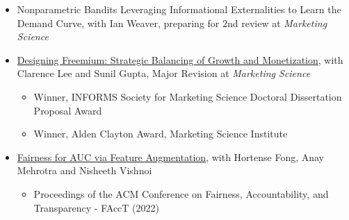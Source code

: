 \documentclass[margin, line, centered, 10pt]{res}
\begin{document}
\begin{resume}
\begin{itemize}
\item Nonparametric Bandits Leveraging Informational Externalities to Learn the Demand Curve, with Ian Weaver, preparing for 2nd review at \textit{Marketing Science}
\item  \href{http://vineetkumars.github.io/Papers/DesigningFreemiumS2019.pdf}{Designing Freemium: Strategic Balancing of Growth and Monetization}, with Clarence Lee and Sunil Gupta, Major Revision at \textit{Marketing Science}
\begin{itemize}
\item Winner, INFORMS Society for Marketing Science Doctoral Dissertation Proposal Award
\item Winner, Alden Clayton Award, Marketing Science Institute
\end{itemize}
\item \href{http://vineetkumars.github.io/Papers/FairnessAUC.pdf}{Fairness for AUC via Feature Augmentation}, with Hortense Fong, Anay Mehrotra and Nisheeth Vishnoi  %
\begin{itemize}
\item Proceedings of the ACM Conference on Fairness, Accountability, and Transparency - FAccT (2022)
\end{itemize}


\end{itemize}
\end{resume}
\end{document}
